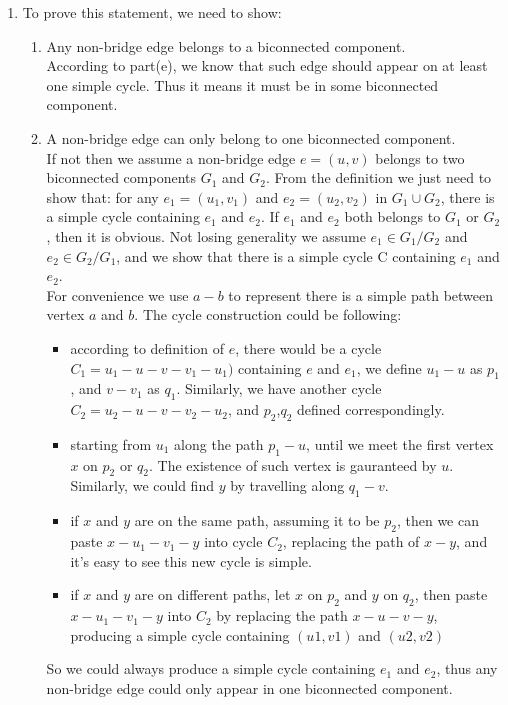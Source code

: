 \documentclass[paper=a4, fontsize=11pt]{scrartcl} %
\numberwithin{equation}{section} %
\numberwithin{figure}{section} %
\numberwithin{table}{section} %
\begin{document}
\begin{enumerate}[label={2.(\alph*)}]
  \item 

  To prove this statement, we need to show:
  \begin{enumerate}
    \item Any non-bridge edge belongs to a biconnected component.\\
      According to part(e), we know that such edge should appear on at least one simple cycle. Thus it means it must be in some biconnected component.
    \item A non-bridge edge can only belong to one biconnected component.\\
      If not then we assume a non-bridge edge $e=(u,v)$ belongs to two
      biconnected components $G_1$ and $G_2$. From the definition we just need
      to show that: for any $e_1=(u_1,v_1)$ and $e_2=(u_2,v_2)$ in $G_1 \cup G_2$, there is a
      simple cycle containing $e_1$ and $e_2$. If $e_1$ and $e_2$ both belongs
      to $G_1$ or $G_2$, then it is obvious.  Not losing generality we assume
      $e_1 \in G_1/G_2$ and $e_2 \in G_2/G_1$, and we show that there is a
      simple cycle C containing $e_1$ and $e_2$.\\

      For convenience we use $a-b$ to represent there is a simple path between vertex $a$ and $b$. The cycle construction could be following:
      \begin{itemize}
	\item according to definition of $e$, there would be a cycle $C_1=u_1-u-v-v_1-u_1)$ containing $e$ and $e_1$, we define $u_1-u$ as $p_1$, and
	  $v-v_1$ as $q_1$. Similarly, we have another cycle $C_2=u_2-u-v-v_2-u_2$, and $p_2$,$q_2$ defined correspondingly.
	\item starting from $u_1$ along the path $p_1-u$, until we meet the first vertex $x$ on $p_2$ or $q_2$. The existence of such vertex is
	  gauranteed by $u$. Similarly, we could find $y$ by travelling along $q_1-v$. 
	\item if $x$ and $y$ are on the same path, assuming it to be $p_2$, then we can paste $x-u_1-v_1-y$ into cycle $C_2$, replacing
	  the path of $x-y$, and it's easy to see this new cycle is simple.
	\item if $x$ and $y$ are on different paths, let $x$ on $p_2$ and $y$ on $q_2$, then paste $x-u_1-v_1-y$ into $C_2$ by
	  replacing the path $x-u-v-y$, producing a simple cycle containing $(u1,v1)$ and $(u2,v2)$
      \end{itemize}
      So we could always produce a simple cycle containing $e_1$ and $e_2$, thus any non-bridge edge could only appear in one
      biconnected component.


\end{enumerate}
\end{enumerate}
\end{document}
